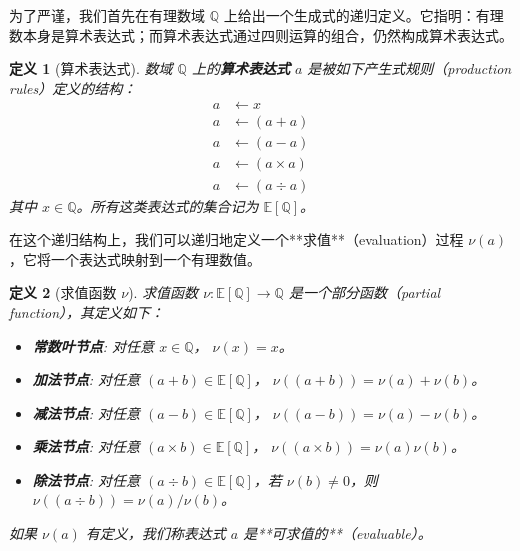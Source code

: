 \documentclass[a4paper,12pt]{book}
\numberwithin{problem}{section}
\newtheorem{definition}{定义}
\numberwithin{definition}{section}
\numberwithin{lemma}{section}
\numberwithin{proposition}{section}
\numberwithin{theorem}{section}
\numberwithin{grammar}{section}
\numberwithin{program}{section}
\numberwithin{convention}{section}
\numberwithin{corollary}{section}
\begin{document}
为了严谨，我们首先在有理数域 $\mathbb{Q}$ 上给出一个生成式的递归定义。它指明：有理数本身是算术表达式；而算术表达式通过四则运算的组合，仍然构成算术表达式。

\begin{definition}[算术表达式]
    \label{def:arithmetic_expression_formal}
    数域 $\mathbb{Q}$ 上的\textbf{算术表达式} $a$ 是被如下产生式规则（production rules）定义的结构：
    \begin{equation}
        \begin{aligned}
            a & \longleftarrow x \\
            a & \longleftarrow ( a + a ) \\
            a & \longleftarrow ( a - a ) \\
            a & \longleftarrow ( a \times a ) \\
            a & \longleftarrow ( a \div a )
        \end{aligned}
    \end{equation}
    其中 $x \in \mathbb{Q}$。所有这类表达式的集合记为 $\mathbb{E}[\mathbb{Q}]$。
\end{definition}

在这个递归结构上，我们可以递归地定义一个**求值**（evaluation）过程 $\nu(a)$，它将一个表达式映射到一个有理数值。

\begin{definition}[求值函数 $\nu$]
    \label{def:evaluation_nu}
    求值函数 $\nu: \mathbb{E}[\mathbb{Q}] \to \mathbb{Q}$ 是一个部分函数（partial function），其定义如下：
    \begin{itemize}
        \item \textbf{常数叶节点}: 对任意 $x \in \mathbb{Q}$， $\nu(x) = x$。
        \item \textbf{加法节点}: 对任意 $(a+b) \in \mathbb{E}[\mathbb{Q}]$， $\nu((a + b)) = \nu(a) + \nu(b)$。
        \item \textbf{减法节点}: 对任意 $(a-b) \in \mathbb{E}[\mathbb{Q}]$， $\nu((a - b)) = \nu(a) - \nu(b)$。
        \item \textbf{乘法节点}: 对任意 $(a \times b) \in \mathbb{E}[\mathbb{Q}]$， $\nu((a \times b)) = \nu(a) \nu(b)$。
        \item \textbf{除法节点}: 对任意 $(a \div b) \in \mathbb{E}[\mathbb{Q}]$，若 $\nu(b) \neq 0$，则 $\nu((a \div b)) = \nu(a) / \nu(b)$。
    \end{itemize}
    如果 $\nu(a)$ 有定义，我们称表达式 $a$ 是**可求值的**（evaluable）。
\end{definition}
\end{document}
